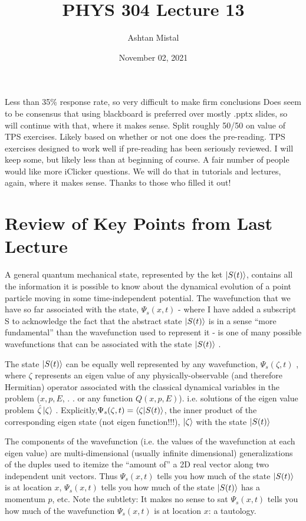 \documentclass{article}
\title{PHYS 304 Lecture 13}
\author{Ashtan Mistal}
\date{November 02, 2021}
\begin{document}
\ifstandalone
\maketitle
\fi

\graphicspath{{./Lecture13/}}

Less than 35\% response rate, so very difficult to make firm conclusions Does seem to be consensus that using blackboard is preferred over mostly .pptx slides, so will continue with that, where it makes sense. Split roughly 50/50 on value of TPS exercises. Likely based on whether or not one does the pre-reading. TPS exercises designed to work well if pre-reading has been seriously reviewed. I will keep some, but likely less than at beginning of course. A fair number of people would like more iClicker questions. We will do that in tutorials and lectures, again, where it makes sense. Thanks to those who filled it out!


\section{Review of Key Points from Last Lecture}

A general quantum mechanical state, represented by the ket $\ket{S(t)}$, contains all the information it is possible to know about the dynamical evolution of a point particle moving in some time-independent potential. The wavefunction that we have so far associated with the state, $\Psi_s(x,t)$ - where I have added a subscript S to acknowledge the fact that the abstract state $\ket{S(t)}$ is in a sense “more fundamental” than the wavefunction used to represent it - is one of many possible wavefunctions that can be associated with the state $\ket{S(t)}$ .

The state $\ket{S(t)}$ can be equally well represented by any wavefunction, $\Psi_s(\zeta, t)$ , where $\zeta$ represents an eigen value of any physically-observable (and therefore Hermitian) operator associated with the classical dynamical variables in the problem ($x,p,E$, . . or any function $Q(x,p,E)$). i.e. solutions of the eigen value problem $\hat{\zeta} \ket{\zeta}$ . Explicitly,$\Psi_s(\zeta, t) = \braket{\zeta|S(t)}$, the inner product of the corresponding eigen state (not eigen function!!!), $\ket{\zeta}$ with the state  $\ket{S(t)}$


The components of the wavefunction (i.e. the values of the wavefunction at each eigen value) are multi-dimensional (usually infinite dimensional) generalizations of the duples used to itemize the “amount of” a 2D real vector along two independent unit vectors. Thus $\Psi_s(x,t)$ tells you how much of the state $\ket{S(t)}$ is at location $x$, $\Psi_s(x,t)$ tells you how much of the state $\ket{S(t)}$ has a momentum $p$, etc. Note the subtlety: It makes no sense to sat $\Psi_s(x,t)$ tells you how much of the wavefunction $\Psi_s(x,t)$ is at location $x$: a tautology. 
\end{document}
